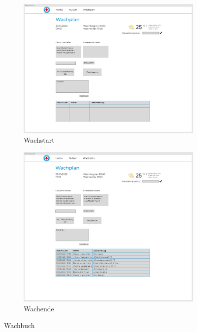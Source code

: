 \documentclass[fontsize=12pt,openright,oneside,paper=a4,BCOR=1cm]{scrbook}
\begin{document}
\begin{figure}[H]
  \centering
  \begin{subfigure}[b]{0.8\linewidth}
    \includegraphics[width=\linewidth]{Anlagen/Figma/14-WachplanDurchfuehrung.png}
    \caption{Wachstart}
  \end{subfigure}
  \begin{subfigure}[b]{0.8\linewidth}
    \includegraphics[width=\linewidth]{Anlagen/Figma/19-WachplanDurchfuehrung.png}
    \caption{Wachende}
  \end{subfigure}
  \caption{Wachbuch}
  \label{fig:wachbuch}
\end{figure}
\end{document}
